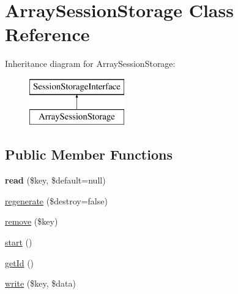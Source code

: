 \hypertarget{class_symfony_1_1_component_1_1_http_foundation_1_1_session_storage_1_1_array_session_storage}{
\section{\-Array\-Session\-Storage \-Class \-Reference}
\label{class_symfony_1_1_component_1_1_http_foundation_1_1_session_storage_1_1_array_session_storage}
}
\-Inheritance diagram for \-Array\-Session\-Storage\-:\begin{figure}[H]
\begin{center}
\leavevmode
\includegraphics[height=2.000000cm]{class_symfony_1_1_component_1_1_http_foundation_1_1_session_storage_1_1_array_session_storage}
\end{center}
\end{figure}
\subsection*{\-Public \-Member \-Functions}
\begin{DoxyCompactItemize}
\item 
\hypertarget{class_symfony_1_1_component_1_1_http_foundation_1_1_session_storage_1_1_array_session_storage_a975b0434ec898581f1d920e4ed1b3b79}{
{\bfseries read} (\$key, \$default=null)}
\label{class_symfony_1_1_component_1_1_http_foundation_1_1_session_storage_1_1_array_session_storage_a975b0434ec898581f1d920e4ed1b3b79}

\item 
\hyperlink{class_symfony_1_1_component_1_1_http_foundation_1_1_session_storage_1_1_array_session_storage_a8a41caa79708db4e79d5d453e2cae6b1}{regenerate} (\$destroy=false)
\item 
\hyperlink{class_symfony_1_1_component_1_1_http_foundation_1_1_session_storage_1_1_array_session_storage_a95483af4e2c07dc9893fe058b026bd5d}{remove} (\$key)
\item 
\hyperlink{class_symfony_1_1_component_1_1_http_foundation_1_1_session_storage_1_1_array_session_storage_af8fa59992209e36dccb3eefb0f75531f}{start} ()
\item 
\hyperlink{class_symfony_1_1_component_1_1_http_foundation_1_1_session_storage_1_1_array_session_storage_a12251d0c022e9e21c137a105ff683f13}{get\-Id} ()
\item 
\hyperlink{class_symfony_1_1_component_1_1_http_foundation_1_1_session_storage_1_1_array_session_storage_a660fb10f6989d97867e2cd7d9107f864}{write} (\$key, \$data)
\end{DoxyCompactItemize}


